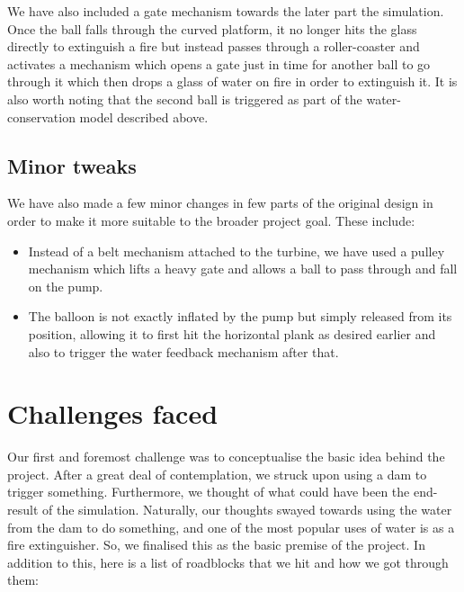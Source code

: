 \documentclass{report}
\begin{document}
We have also included a gate mechanism towards the later part the simulation. Once the ball falls through the curved platform, it no longer hits the glass directly to extinguish a fire but instead passes through a roller-coaster and activates a mechanism which opens a gate just in time for another ball to go through it which then drops a glass of water on fire in order to extinguish it. It is also worth noting that the second ball is triggered as part of the water-conservation model described above.

\subsection{Minor tweaks}
We have also made a few minor changes in few parts of the original design in order to make it more suitable to the broader project goal. These include:
\begin{itemize}
\item Instead of a belt mechanism attached to the turbine, we have used a pulley mechanism which lifts a heavy gate and allows a ball to pass through and fall on the pump.
\item The balloon is not exactly inflated by the pump but simply released from its position, allowing it to first hit the horizontal plank as desired earlier and also to trigger the water feedback mechanism after that.
\end{itemize}


\section{Challenges faced}
Our first and foremost challenge was to conceptualise the basic idea behind the project. After a great deal of contemplation, we struck upon using a dam to trigger something. Furthermore, we thought of what could have been the end-result of the simulation. Naturally, our thoughts swayed towards using the water from the dam to do something, and one of the most popular uses of water is as a fire extinguisher. So, we finalised this as the basic premise of the project. In addition to this, here is a list of roadblocks that we hit and how we got through them:
\end{document}
